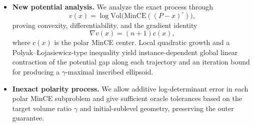 \documentclass[smallextended]{svjour3}
\newcommand{\Vol}{\mathrm{Vol}}
\begin{document}
\begin{itemize}
    \item \textbf{New potential analysis.} We analyze the exact process through
    \[
        v(x)=\log \Vol\bigl(\mathrm{MinCE}((P-x)^\circ)\bigr),
    \]
    proving convexity, differentiability, and the gradient identity
    \[
        \nabla v(x)=(n+1)c(x),
    \]
    where $c(x)$ is the polar MinCE center. Local quadratic growth and a
    Polyak–Łojasiewicz-type inequality yield instance-dependent global linear contraction of the potential gap along each trajectory and
    an iteration bound for producing a $\gamma$-maximal inscribed ellipsoid.

    \item \textbf{Inexact polarity process.} We allow additive log-determinant
    error in each polar MinCE subproblem and give sufficient oracle tolerances
    based on the target volume ratio $\gamma$ and initial-sublevel geometry,
    preserving the outer guarantee.


\end{itemize}
\end{document}
